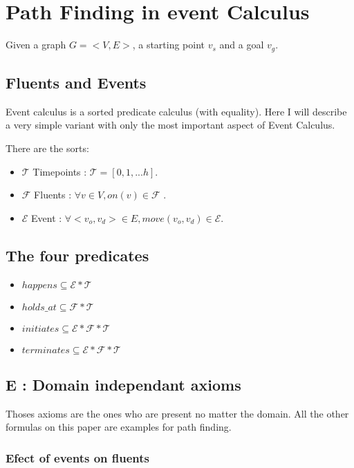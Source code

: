 \section{Path Finding in event Calculus}\label{sec:introduction}

Given a graph $G = <V,E>$, a starting point $v_s$ and a goal $v_g$.

\subsection{Fluents and Events}

Event calculus is a sorted predicate calculus (with equality).
Here I will describe a very simple variant with only the most important aspect of Event Calculus.

There are the sorts:

\begin{itemize}
  \item $\mathcal{T}$ Timepoints : $\mathcal{T} = [0, 1, ... h]$.
  \item $\mathcal{F}$ Fluents : $\forall v \in V, on(v) \in \mathcal{F}$ .
  \item $\mathcal{E}$ Event : $\forall <v_o,v_d> \in E, move(v_o,v_d) \in \mathcal{E}$.
\end{itemize}

\subsection{The four predicates}

\begin{itemize}
  \item $happens \subseteq \mathcal{E}*\mathcal{T}$
  \item $holds\_at \subseteq \mathcal{F}*\mathcal{T}$
  \item $initiates \subseteq \mathcal{E}*\mathcal{F}*\mathcal{T}$
  \item $terminates \subseteq \mathcal{E}*\mathcal{F}*\mathcal{T}$
\end{itemize}

\subsection{E : Domain independant axioms}

Thoses axioms are the ones who are present no matter the domain.
All the other formulas on this paper are examples for path finding.

\subsubsection{Efect of events on fluents}

